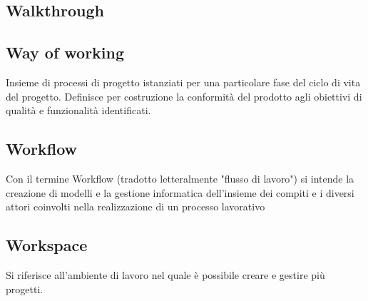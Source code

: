 
\subsection*{Walkthrough}

\subsection*{Way of working}
Insieme  di  processi  di  progetto  istanziati  per  una  particolare  fase  del  ciclo  di  vita  del
progetto. Definisce  per  costruzione  la  conformità  del  prodotto  agli  obiettivi  di
qualità e funzionalità identificati.

\subsection*{Workflow}
Con il termine Workflow (tradotto letteralmente "flusso di lavoro") si intende la creazione di modelli e la gestione informatica dell'insieme dei compiti e i diversi attori coinvolti nella realizzazione di un processo lavorativo

\subsection*{Workspace}
Si riferisce all’ambiente di lavoro nel quale è possibile creare e gestire più progetti.

